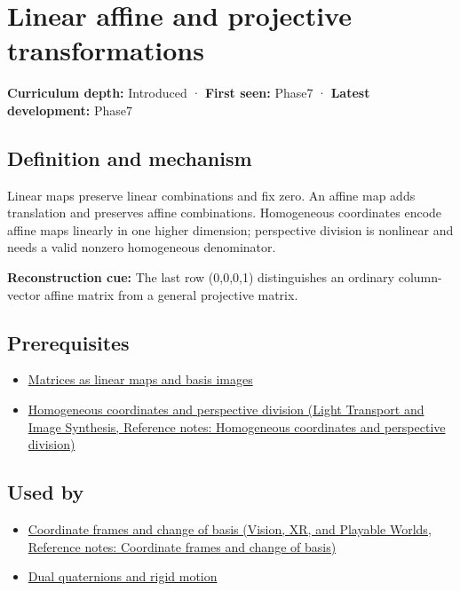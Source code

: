 \hypertarget{appendix-0bf0ca73f735}{}\label{referencestart:appendix-0bf0ca73f735}
\section{Linear affine and projective transformations}\label{appendix-0bf0ca73f735-linear-affine-and-projective-transformations}

\textbf{Curriculum depth:} Introduced · \textbf{First seen:} Phase7 · \textbf{Latest development:} Phase7

\subsection{Definition and mechanism}\label{appendix-0bf0ca73f735-definition-and-mechanism}

Linear maps preserve linear combinations and fix zero. An affine map adds translation and preserves affine combinations. Homogeneous coordinates encode affine maps linearly in one higher dimension; perspective division is nonlinear and needs a valid nonzero homogeneous denominator.

\textbf{Reconstruction cue:} The last row (0,0,0,1) distinguishes an ordinary column-vector affine matrix from a general projective matrix.

\subsection{Prerequisites}\label{appendix-0bf0ca73f735-prerequisites}

\begin{itemize}
\tightlist
\item
  \hyperref[appendix-bd39c3bf5d64]{Matrices as linear maps and basis images}
\item
  \href{../04-Light-Transport-and-Image-Synthesis/main.pdf\#nameddest=appendix-cb3b26862282}{Homogeneous coordinates and perspective division (Light Transport and Image Synthesis, Reference notes: Homogeneous coordinates and perspective division)}
\end{itemize}

\subsection{Used by}\label{appendix-0bf0ca73f735-used-by}

\begin{itemize}
\tightlist
\item
  \href{../07-Vision-XR-and-Playable-Worlds/main.pdf\#nameddest=appendix-1bae9457dbc3}{Coordinate frames and change of basis (Vision, XR, and Playable Worlds, Reference notes: Coordinate frames and change of basis)}
\item
  \hyperref[appendix-d1ea57347893]{Dual quaternions and rigid motion}
\end{itemize}

